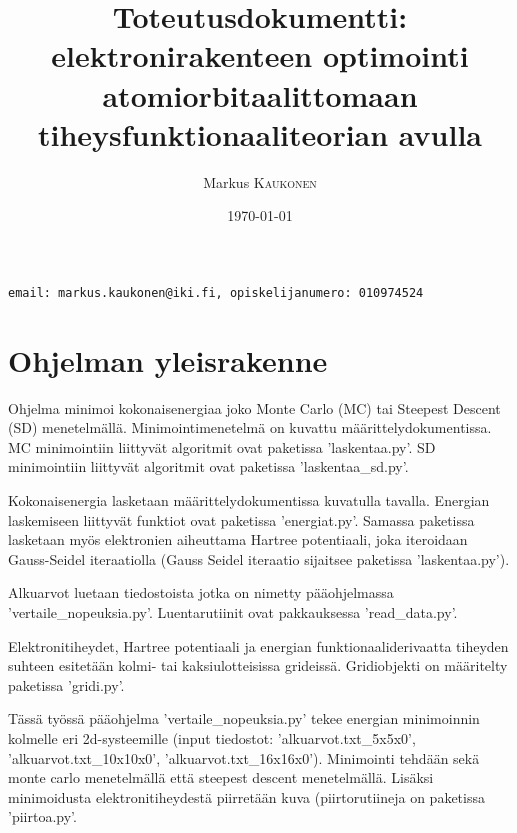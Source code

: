 \documentclass{article}
\title{Toteutusdokumentti: elektronirakenteen optimointi atomiorbitaalittomaan tiheysfunktionaaliteorian avulla} %
\author{Markus \textsc{Kaukonen} %
}
\date{\today} %
\begin{document}
\maketitle %
\hspace{1cm} \texttt{email: markus.kaukonen@iki.fi, opiskelijanumero: 010974524}

\newpage



\section{Ohjelman yleisrakenne}
Ohjelma minimoi kokonaisenergiaa joko Monte Carlo (MC) tai Steepest
Descent (SD) menetelmällä. Minimointimenetelmä on kuvattu
määrittelydokumentissa. MC minimointiin liittyvät algoritmit ovat
paketissa 'laskentaa.py'. SD minimointiin liittyvät algoritmit ovat
paketissa 'laskentaa\_sd.py'.

Kokonaisenergia lasketaan määrittelydokumentissa kuvatulla
tavalla. Energian laskemiseen liittyvät funktiot ovat paketissa
'energiat.py'. Samassa paketissa lasketaan myös elektronien aiheuttama
Hartree potentiaali, joka iteroidaan Gauss-Seidel iteraatiolla (Gauss
Seidel iteraatio sijaitsee paketissa 'laskentaa.py').

Alkuarvot luetaan tiedostoista jotka on nimetty pääohjelmassa
'vertaile\_nopeuksia.py'. Luentarutiinit ovat pakkauksessa
'read\_data.py'.

Elektronitiheydet, Hartree potentiaali ja energian
funktionaaliderivaatta tiheyden suhteen esitetään kolmi- tai
kaksiulotteisissa grideissä. Gridiobjekti on määritelty paketissa
'gridi.py'.

Tässä työssä pääohjelma 'vertaile\_nopeuksia.py' tekee energian
minimoinnin kolmelle eri 2d-systeemille (input tiedostot:
'alkuarvot.txt\_5x5x0', 'alkuarvot.txt\_10x10x0',
'alkuarvot.txt\_16x16x0'). Minimointi tehdään sekä monte carlo
menetelmällä että steepest descent menetelmällä. Lisäksi minimoidusta
elektronitiheydestä piirretään kuva (piirtorutiineja on paketissa
'piirtoa.py'.
\end{document}
